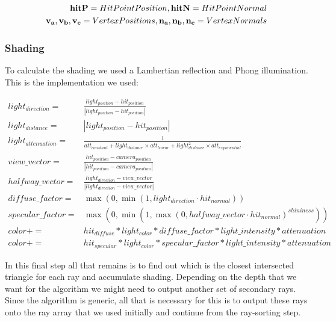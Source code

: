 \begin{align*}
    \textbf{hitP} = Hit Point Position,     
    \textbf{hitN} = Hit Point Normal\\
    \textbf{v\textsubscript{a}}, \textbf{v\textsubscript{b}}, \textbf{v\textsubscript{c}} = Vertex Positions,                     
    \textbf{n\textsubscript{a}}, \textbf{n\textsubscript{b}}, \textbf{n\textsubscript{c}} = Vertex Normals\\
\end{align*}

\subsubsection{Shading}

To calculate the shading we used a Lambertian reflection and Phong illumination. This is the implementation we used:

\begin{subequations}
    \begin{flalign}
        {light_{direction}} = & 
        {\frac{light_{position} - hit_{position}}{|light_{position} - hit_{position}|}}\\[10pt]
        {light_{distance} =} & 
        {|light_{position} - hit_{position}|}\\[10pt]          
        {light_{attenuation} =} & 
        {\frac{1}{att_{constant} + light_{distance} \times att_{linear} + light_{distance}^2 \times att_{exponential}}}\\[10pt]
        {view\_vector} = & 
        {\frac{hit_{position} - camera_{position}}{|hit_{position} - camera_{position}|}}\\[10pt]
        {halfway\_vector} = & 
        {\frac{light_{direction} - view\_vector}{|light_{direction} - view\_vector|}}\\[10pt]
        {diffuse\_factor} = & {\max(0,\min(1, light_{direction} \cdot hit_{normal}))}\\[10pt]
        {specular\_factor} = & {\max(0,\min(1,\max(0,halfway\_vector \cdot hit_{normal})^{shininess}))}\\[10pt]
        {color} += & {hit_{diffuse} * light_{color} * diffuse\_factor * light\_intensity * attenuation}\\[10pt]
        {color} += & {hit_{specular} * light_{color} * specular\_factor * light\_intensity * attenuation}
    \end{flalign}
\end{subequations}

In this final step all that remains is to find out which is the closest intersected triangle for each ray and accumulate shading. Depending on the depth that we want for the algorithm we might need to output another set of secondary rays. Since the algorithm is generic, all that is necessary for this is to output these rays onto the ray array that we used initially and continue from the ray-sorting step.